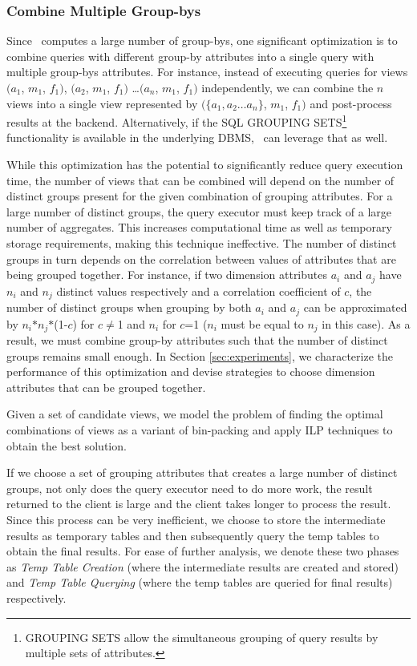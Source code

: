 \subsubsection {Combine Multiple Group-bys}
\label{subsec:mult_gb}
  Since \SeeDB\ computes a large number of group-bys, one significant
  optimization is to combine queries with different group-by attributes into a
  single query with multiple group-bys attributes.
  For instance, instead of executing queries for views $(a_1$, $m_1$, $f_1)$,
  $(a_2$, $m_1$, $f_1)$ \ldots $(a_n$, $m_1$, $f_1)$ independently, we can
  combine the $n$ views into a single view represented by $(\{a_1, a_2\ldots
  a_n\}$, $m_1$, $f_1)$ and post-process results at the backend. Alternatively,
  if the SQL GROUPING SETS\footnote{GROUPING SETS allow the simultaneous
  grouping of query results by multiple sets of attributes.} functionality is
  available in the underlying DBMS, \SeeDB\ can leverage that as well.

  While this optimization has the potential to significantly reduce query
  execution time, the number of views that can be combined will depend on the
  number of distinct groups present for the given combination of grouping
  attributes. For a large number of distinct groups, the query executor must
  keep track of a large number of aggregates. This increases computational time
  as well as temporary storage requirements, making this technique ineffective.
  The number of distinct groups in turn depends on the correlation between
  values of attributes that are being grouped together. For instance, if two
  dimension attributes $a_i$ and $a_j$ have $n_i$ and $n_j$ distinct values
  respectively and a correlation coefficient of $c$, the number of distinct
  groups when grouping by both $a_i$ and $a_j$ can be approximated by
  $n_i$$\ast$$n_j$$\ast$(1-$c$) for $c$$\neq$1 and $n_i$ for $c$=1 ($n_i$ must
  be equal to $n_j$ in this case).
  As a result, we must combine group-by attributes such that the number of
  distinct groups remains small enough. In Section \ref{sec:experiments}, we
  characterize the performance of this optimization and devise strategies to
  choose dimension attributes that can be grouped together.
  
  Given a set of candidate views, we model the
  problem of finding the optimal combinations of views as a variant of
  bin-packing and apply ILP techniques to obtain the best solution. \\
  
  If we choose a set of grouping attributes that creates a large number of
  distinct groups, not only does the query executor need to do more work, the result
  returned to the client is large and the client takes longer to process the
  result. Since this process can be very inefficient, we choose to store
  the intermediate results as temporary tables and then subsequently query the
  temp tables to obtain the final results. For ease of further analysis, we
  denote these two phases as {\it Temp Table Creation} (where the
  intermediate results are created and stored) and {\it Temp Table Querying}
  (where the temp tables are queried for final results) respectively.
  
